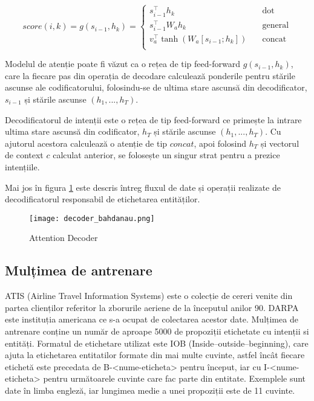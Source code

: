 \label{attn-types}
\[ score(i, k) = g(s_{i-1}, h_k) =
\begin{cases}
s_{i-1}^\top h_k			&	\quad \text{dot}\\
s_{i-1}^\top W_a h_k	&	\quad \text{general}\\
v_a^\top \tanh(W_a [s_{i-1};h_k])	&	\quad \text{concat}\\
\end{cases}
\]

Modelul de atenție poate fi văzut ca o rețea de tip feed-forward $g(s_{i-1}, h_k)$, care la fiecare pas din operația de decodare calculează ponderile pentru stările ascunse ale codificatorului, folosindu-se de ultima stare ascunsă din decodificator, $s_{i-1}$ și stările ascunse $(h_1, ..., h_T)$.

Decodificatorul de intenții este o rețea de tip feed-forward ce primește la intrare ultima stare ascunsă din codificator, $h_T$ și stările ascunse $(h_1, ..., h_T)$. Cu ajutorul acestora calculează o atenție de tip $concat$, apoi folosind $h_T$ și vectorul de context $c$ calculat anterior, se folosește un singur strat pentru a prezice intențiile.

Mai jos în figura \ref{fig:dec_bah} este descris întreg fluxul de date și operații realizate de decodificatorul responsabil de etichetarea entităților.

\begin{figure}[h]
	\centering
	\texttt{[image: decoder\_bahdanau.png]}
	\caption{Attention Decoder}
	\label{fig:dec_bah}
\end{figure}

\subsection{Mulțimea de antrenare}
ATIS (Airline Travel Information Systems) \cite{atis} este o colecție de cereri venite din partea clienților referitor la zborurile aeriene de la începutul anilor 90. DARPA este instituția americana ce s-a ocupat de colectarea acestor date. Mulțimea de antrenare conține un număr de aproape 5000 de propoziții etichetate cu intenții si entități. Formatul de etichetare utilizat este IOB (Inside–outside–beginning), care ajuta la etichetarea entitatilor formate din mai multe cuvinte, astfel încât fiecare etichetă este precedata de B-<nume-eticheta> pentru început, iar cu I-<nume-eticheta> pentru următoarele cuvinte care fac parte din entitate. Exemplele sunt date în limba engleză, iar lungimea medie a unei propoziții este de 11 cuvinte.

